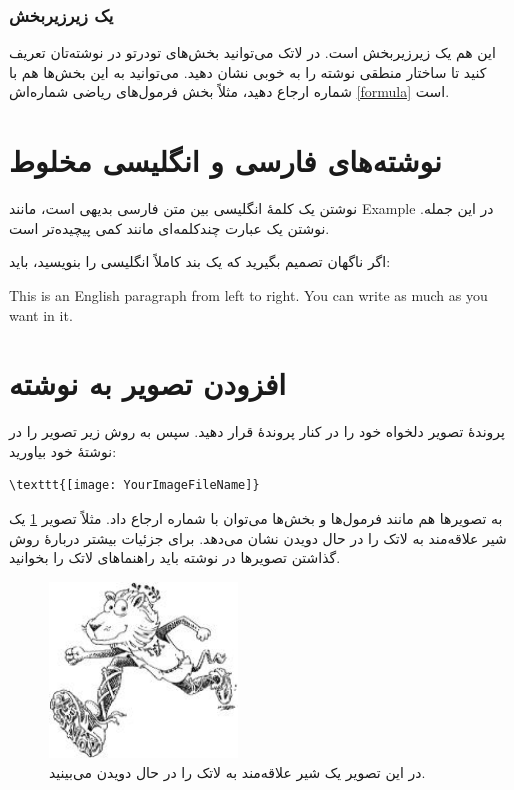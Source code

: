 \documentclass{article}
\begin{document}
\subsubsection{یک زیرزیربخش}
این هم یک زیرزیربخش است. در لاتک می‌توانید بخش‌های تودرتو در نوشته‌تان تعریف کنید تا ساختار منطقی نوشته را به خوبی نشان دهید. می‌توانید به این بخش‌ها هم با شماره ارجاع دهید، مثلاً بخش فرمول‌های ریاضی شماره‌اش \ref{formula} است.
\section{نوشته‌های فارسی و انگلیسی مخلوط}
نوشتن یک کلمهٔ انگلیسی بین متن فارسی بدیهی است، مانند Example در این جمله.
نوشتن یک عبارت چندکلمه‌ای مانند
  کمی پیچیده‌تر است.

اگر ناگهان تصمیم بگیرید که یک بند کاملاً انگلیسی را بنویسید، باید:
\begin{latin}
This is an English paragraph from left to right. You can write as much as you want in it.
\end{latin}
\section{افزودن تصویر به نوشته}
پروندهٔ تصویر دلخواه خود را در کنار پروندهٔ  قرار دهید. سپس به روش زیر تصویر را در نوشتهٔ خود بیاورید:
\begin{latin}
\begin{verbatim}
\texttt{[image: YourImageFileName]}
\end{verbatim}
\end{latin}
به تصویرها هم مانند فرمول‌ها و بخش‌ها می‌توان با شماره ارجاع داد. مثلاً تصویر  \ref{shir} یک شیر علاقه‌مند به لاتک را در حال دویدن نشان می‌دهد. برای جزئیات بیشتر دربارهٔ روش گذاشتن تصویرها در نوشته باید راهنماهای لاتک را بخوانید.
\begin{figure}%
\centerline{\includegraphics[width=5cm]{lion}}
\caption{\label{shir}\small در این تصویر یک شیر علاقه‌مند به لاتک را در حال دویدن می‌بینید.}
\end{figure}
\end{document}
